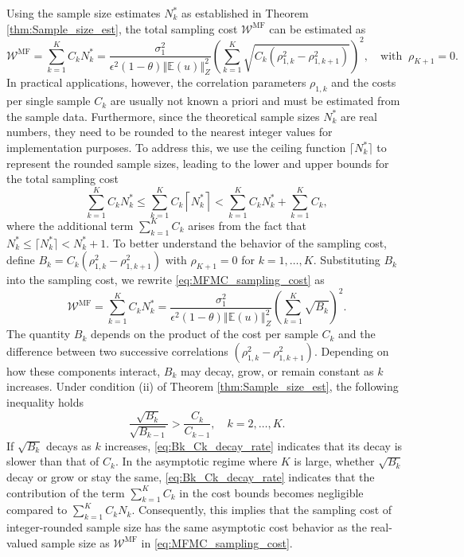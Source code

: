 %
Using the sample size estimates $N_k^*$ as established in Theorem \ref{thm:Sample_size_est}, the total sampling cost $\mathcal{W}^\text{MF}$ can be estimated as
%
\begin{equation}\label{eq:MFMC_sampling_cost}
    \mathcal{W}^\text{MF} = \sum_{k=1}^K C_k N_k^* = \frac{\sigma_1^2}{\epsilon^2(1-\theta)\left\Vert\mathbb{E}(u) \right\Vert_{Z}^2}\left(\sum_{k=1}^K\sqrt{C_k\left(\rho_{1,k}^2 - \rho_{1,k+1}^2\right)}\right)^2,\quad \text{with}\;\;\rho_{K+1}=0.
\end{equation}
%
In practical applications, however, the correlation parameters $\rho_{1,k}$ and the costs per single sample $C_k$ are usually not known a priori and must be estimated from the sample data. Furthermore, since the theoretical sample sizes $N_k^*$ are real numbers, they need to be rounded to the nearest integer values for implementation purposes. To address this, we use the ceiling function $\lceil N_k^* \rceil$ to represent the rounded sample sizes, leading to the lower and upper bounds for the total sampling cost
%
\begin{equation}\label{eq:sampling_cost_bound}
    \sum_{k=1}^K C_k N_k^*\le \sum_{k=1}^K C_k \left\lceil N_k^*\right\rceil<\sum_{k=1}^K C_k N_k^* + \sum_{k=1}^K C_k,
\end{equation}
%
where the additional term $\sum_{k=1}^K C_k$ arises from the fact that $N_k^*\le \lceil N_k^*\rceil< N_k^*+1$. To better understand the behavior of the sampling cost, define $B_k = C_k(\rho_{1,k}^2 - \rho_{1,k+1}^2)$ with $\rho_{K+1}=0$ for $k=1,\dots, K$. Substituting $B_k$ into the sampling cost, we rewrite \eqref{eq:MFMC_sampling_cost} as
%
\begin{equation*}\label{eq:MFMC_sampling_cost_2}
    \mathcal{W}^{\text{MF}} = \sum_{k=1}^K C_k N_k^* = \frac{\sigma_1^2}{\epsilon^2(1-\theta)\left\Vert\mathbb{E}(u) \right\Vert_{Z}^2}\left(\sum_{k=1}^K\sqrt{B_k} \right)^2.
\end{equation*}
%
The quantity $B_k$ depends on the product of the cost per sample $C_k$ and the difference between two successive correlations $(\rho_{1,k}^2 - \rho_{1,k+1}^2)$. Depending on how these components interact, $B_k$ may decay, grow, or remain constant as $k$ increases.
Under condition (ii) of Theorem \ref{thm:Sample_size_est}, the following inequality holds
%
\begin{equation}
\label{eq:Bk_Ck_decay_rate}
    \frac{\sqrt{B_{k}}}{\sqrt{B_{k-1}}}>\frac{C_{k}}{C_{k-1}}, \quad k=2,\ldots,K.
\end{equation}
%
If $\sqrt{B_k}$ decays as $k$ increases, \eqref{eq:Bk_Ck_decay_rate} indicates that its decay is slower than that of $C_k$. In the asymptotic regime where $K$ is large, whether $\sqrt{B_k}$ decay or grow or stay the same, \eqref{eq:Bk_Ck_decay_rate} indicates that the contribution of the term $\sum_{k=1}^K C_k$ in the cost bounds becomes negligible compared to $\sum_{k=1}^K C_kN_k$. Consequently, this implies that the sampling cost of integer-rounded sample size has the same asymptotic cost behavior as the real-valued sample size as $\mathcal{W}^\text{MF}$ in \eqref{eq:MFMC_sampling_cost}.





